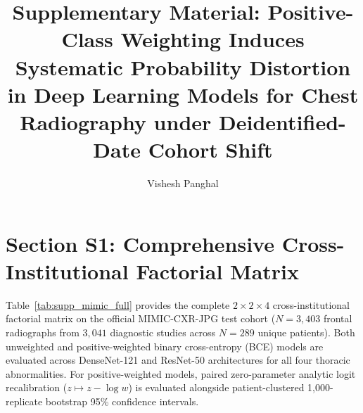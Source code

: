 \documentclass[preprint,12pt]{elsarticle}
\begin{document}
\begin{frontmatter}

\title{Supplementary Material: Positive-Class Weighting Induces Systematic Probability Distortion in Deep Learning Models for Chest Radiography under Deidentified-Date Cohort Shift}

\author{Vishesh Panghal}


\end{frontmatter}

\renewcommand{\thetable}{S\arabic{table}}
\renewcommand{\thefigure}{S\arabic{figure}}
\setcounter{table}{0}
\setcounter{figure}{0}

\section*{Section S1: Comprehensive Cross-Institutional Factorial Matrix}
Table~\ref{tab:supp_mimic_full} provides the complete $2 \times 2 \times 4$ cross-institutional factorial matrix on the official MIMIC-CXR-JPG test cohort ($N = 3,403$ frontal radiographs from $3,041$ diagnostic studies across $N = 289$ unique patients). Both unweighted and positive-weighted binary cross-entropy (BCE) models are evaluated across DenseNet-121 and ResNet-50 architectures for all four thoracic abnormalities. For positive-weighted models, paired zero-parameter analytic logit recalibration ($z \mapsto z - \log w$) is evaluated alongside patient-clustered 1,000-replicate bootstrap 95\% confidence intervals.
\end{document}
